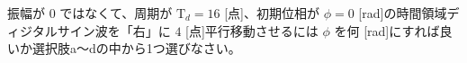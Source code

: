 振幅が $0$ ではなくて、周期が $\textrm{T}_d = 16$ [点]、初期位相が $\phi = 0$ [rad]の時間領域ディジタルサイン波を「右」に $4$ [点]平行移動させるには $\phi$ を何 [rad]にすれば良いか選択肢a〜dの中から1つ選びなさい。
